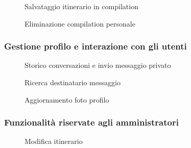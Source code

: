\documentclass{natourDoc}
\begin{document}
\newpage

\begin{figure}[!htpb]
	\centering
	
	\caption{Salvataggio itinerario in compilation}
\end{figure}
\FloatBarrier

\newpage

\begin{figure}[!htpb]
	\centering
	
	\caption{Eliminazione compilation personale}
\end{figure}
\FloatBarrier

\newpage

\subsubsection{Gestione profilo e interazione con gli utenti}
\begin{figure}[!htpb]
	\centering
	
	\caption{Storico conversazioni e invio messaggio privato}
\end{figure}
\FloatBarrier

\begin{figure}[!htpb]
	\centering
	
	\caption{Ricerca destinatario messaggio}
\end{figure}
\FloatBarrier

\begin{figure}[!htpb]
	\centering
	
	\caption{Aggiornamento foto profilo}
\end{figure}
\FloatBarrier

\newpage

\subsubsection{Funzionalità riservate agli amministratori}
\begin{figure}[!htpb]
	\centering
	
	\caption{Modifica itinerario}
\end{figure}
\FloatBarrier

\newpage
\end{document}
